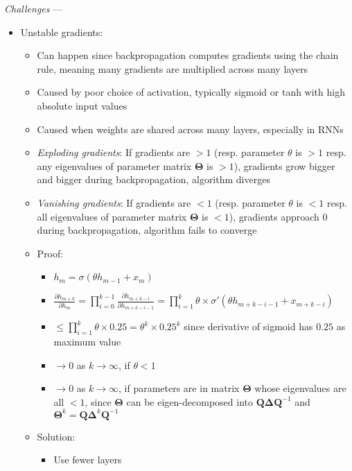 \emph{Challenges} ---
\begin{itemize}
    \item Unstable gradients:
    \begin{itemize}
        \item Can happen since backpropagation computes gradients using the chain rule, meaning many gradients are multiplied across many layers
        \item Caused by poor choice of activation, typically sigmoid or tanh with high absolute input values
        \item Caused when weights are shared across many layers, especially in RNNs
        \item \emph{Exploding gradients}: If gradients are $> 1$ (resp. parameter $\theta$ is $> 1$ resp. any eigenvalues of parameter matrix $\boldsymbol{\Theta}$ is $>1$), gradients grow bigger and bigger during backpropagation, algorithm diverges
        \item \emph{Vanishing gradients}: If gradients are $< 1$ (resp. parameter $\theta$ is $< 1$ resp. all eigenvalues of parameter matrix $\boldsymbol{\Theta}$ is $<1$), gradients approach $0$ during backpropagation, algorithm fails to converge
        \item Proof:
        \begin{itemize}
            \item $h_m = \sigma(\theta h_{m-1} + x_m)$
            \item $ \frac{\partial h_{m+k}}{\partial h_m}  = \prod_{i=0}^{k-1}  \frac{\partial h_{m+k-i}}{\partial h_{m+k-i-1}} = \prod_{i=1}^{k}  \theta \times \sigma'(\theta h_{m+k-i-1} + x_{m+k-i}) $ 
            \item $\leq \prod_{i=1}^{k}  \theta \times 0.25 = \theta ^k \times 0.25^k$ since derivative of sigmoid has $0.25$ as maximum value
            \item $\to 0$ as $k \to \infty$, if $ \theta  < 1$
            \item $\to 0$ as $k \to \infty$, if parameters are in matrix $\boldsymbol{\Theta}$ whose eigenvalues are all $< 1$, since $\boldsymbol{\Theta}$ can be eigen-decomposed into $\boldsymbol{Q}\boldsymbol{\Delta}\boldsymbol{Q}^{-1}$ and $\boldsymbol{\Theta}^k = \boldsymbol{Q}\boldsymbol{\Delta}^k\boldsymbol{Q}^{-1}$ 
        \end{itemize}
        \item Solution:
        \begin{itemize}
            \item Use fewer layers

\end{itemize}
\end{itemize}
\end{itemize}
